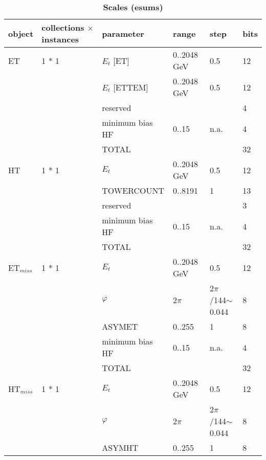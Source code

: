 \documentclass{cmspaper}
\begin{document}
\begin{table}[ht]
\caption{\bf Scales (esums)}
\vspace{5mm}
\centering
\begin{tabular}{| l | l | l | l | l | l |}
\hline
object	&	collections $\times$ instances	&	parameter	&	range	&	step	&	bits \\
\hline\hline
ET	&	1 * 1	&	$E_t$ [ET]	&	0..2048 GeV	&	0.5	&	12                    \\
	&		&	$E_t$ [ETTEM]	&	0..2048 GeV	&	0.5	&	12                    \\
	&		&	reserved	&		&		&	4                    \\
	&		&	minimum bias HF	&      0..15	&	n.a.	&	4                    \\
	&		&	TOTAL	&		&		&	32                    \\
\hline
HT	&	1 * 1	&	$E_t$	&	0..2048 GeV	&	0.5	&	12                    \\
	&		&	TOWERCOUNT	&	0..8191	&	1	&	13                    \\
	&		&	reserved	&		&		&	3                    \\
	&		&	minimum bias HF	&      0..15	&	n.a.	&	4                    \\
	&		&	TOTAL	&		&		&	32                    \\
\hline
ET$_{miss}$    &   1 * 1   &   $E_t$   &   0..2048 GeV &   0.5 &   12                    \\
    &       &   $\varphi$   &   2$\pi$  &   2$\pi$/144$\sim$0.044   &   8                    \\
    &       &   ASYMET    &  0..255     &    1   &   8                    \\
    &       &   minimum bias HF &      0..15    &   n.a.    &   4                    \\
    &       &   TOTAL   &       &       &   32                    \\
\hline
HT$_{miss}$    &   1 * 1   &   $E_t$   &   0..2048 GeV &   0.5 &   12                    \\
    &       &   $\varphi$   &   2$\pi$  &   2$\pi$/144$\sim$0.044   &   8                    \\
    &       &   ASYMHT    &  0..255     &    1   &   8                    \\

\end{tabular}
\end{table}
\end{document}
